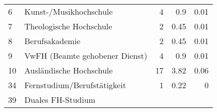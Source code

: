\begin{longtable}{lXrrr}
     6 &
     \multicolumn{1}{X}{ Kunst-/Musikhochschule   } &


       \num{4} &
       \num[round-mode=places,round-precision=2]{0.9} &
         \num[round-mode=places,round-precision=2]{0.01} \\

     7 &
     \multicolumn{1}{X}{ Theologische Hochschule   } &


       \num{2} &
       \num[round-mode=places,round-precision=2]{0.45} &
         \num[round-mode=places,round-precision=2]{0.01} \\

     8 &
     \multicolumn{1}{X}{ Berufsakademie   } &


       \num{2} &
       \num[round-mode=places,round-precision=2]{0.45} &
         \num[round-mode=places,round-precision=2]{0.01} \\

     9 &
     \multicolumn{1}{X}{ VwFH (Beamte gehobener Dienst)   } &


       \num{4} &
       \num[round-mode=places,round-precision=2]{0.9} &
         \num[round-mode=places,round-precision=2]{0.01} \\

     10 &
     \multicolumn{1}{X}{ Ausländische Hochschule   } &


       \num{17} &
       \num[round-mode=places,round-precision=2]{3.82} &
         \num[round-mode=places,round-precision=2]{0.06} \\

     34 &
     \multicolumn{1}{X}{ Fernstudium/Berufstätigkeit   } &


       \num{1} &
       \num[round-mode=places,round-precision=2]{0.22} &
         \num[round-mode=places,round-precision=2]{0} \\

     39 &
     \multicolumn{1}{X}{ Duales FH-Studium   } &



\end{longtable}
